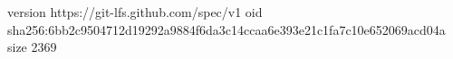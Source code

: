 version https://git-lfs.github.com/spec/v1
oid sha256:6bb2c9504712d19292a9884f6da3c14ccaa6e393e21c1fa7c10e652069acd04a
size 2369
